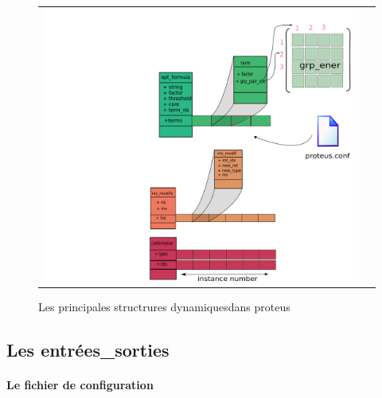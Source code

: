    \begin{figure}[t]
     \centering
     \begin{tabular}{cc}
       \includegraphics[width=12cm]{graphe/proteus/structures_dynamiques.png} &
     \end{tabular}
     
     \caption{Les principales structrures \og dynamiques\fg dans proteus}
\label{graph:struct_Dyna}
   \end{figure}

   

\subsection{Les entrées\_sorties} 


\paragraph{Le fichier de configuration}





